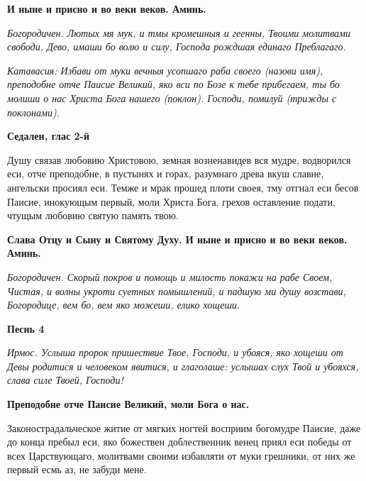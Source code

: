 \bfseries И ныне и присно и во веки веков. Аминь.\normalfont{} 




\itshape Богородичен.\normalfont{} Лютых мя мук, и тмы кромешныя и геенны, Твоими молитвами свободи, Дево, имаши бо волю и силу, Господа рождшая единаго Преблагаго. 




\itshape Катавасия:\normalfont{} Избави от муки вечныя усопшаго раба своего (\itshape назови имя\normalfont{}), преподобне отче Паисие Великий, яко вси по Бозе к тебе прибегаем, ты бо молиши о нас Христа Бога нашего (\itshape поклон\normalfont{}). Господи, помилуй (\itshape трижды с поклонами\normalfont{}). 







\bfseries Седален, глас 2-й\normalfont{}

Душу связав любовию Христовою, земная возненавидев вся мудре, водворился еси, отче преподобне, в пустынях и горах, разумнаго древа вкуш славне, ангельски просиял еси. Темже и мрак прошед плоти своея, тму отгнал еси бесов Паисие, инокующым первый, моли Христа Бога, грехов оставление подати, чтущым любовию святую память твою. 




\bfseries Слава Отцу и Сыну и Святому Духу. И ныне и присно и во веки веков. Аминь.\normalfont{} 




\itshape Богородичен.\normalfont{} Скорый покров и помощь и милость покажи на рабе Своем, Чистая, и волны укроти суетных помышлений, и падшую ми душу возстави, Богородице, вем бо, вем яко можеши, елико хощеши. 




\bfseries Песнь 4 \normalfont{}




\itshape Ирмос.\normalfont{} Услыша пророк пришествие Твое, Господи, и убояся, яко хощеши от Девы родитися и человеком явитися, и глаголаше: услышах слух Твой и убояхся, слава силе Твоей, Господи! 




\bfseries Преподобне отче Паисие Великий, моли Бога о нас.\normalfont{} 




Законострадальческое житие от мягких ногтей восприим богомудре Паисие, даже до конца пребыл еси, яко божествен доблественник венец приял еси победы от всех Царствующаго, молитвами своими избавляти от муки грешники, от них же первый есмь аз, не забуди мене. 




